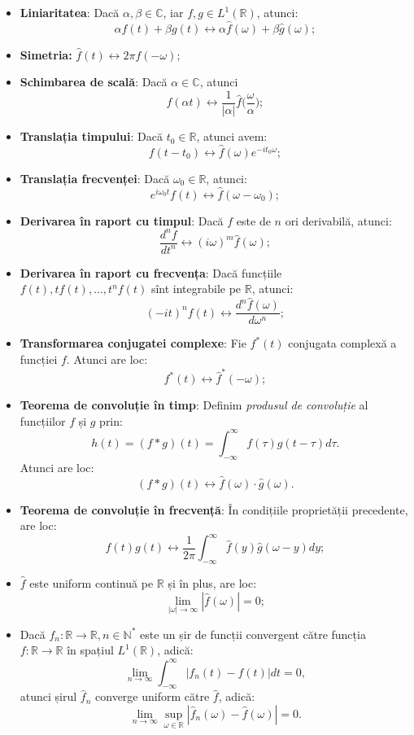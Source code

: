 \documentclass[12pt,a4paper]{article}
\newcommand\NN{\mathbb{N}}
\newcommand\RR{\mathbb{R}}
\newcommand\CC{\mathbb{C}}
\theoremstyle{dotless}
\theoremstyle{dotlessdr}
\begin{document}
\begin{itemize}
\item \textbf{Liniaritatea}: Dacă $ \alpha, \beta \in \CC $, iar $ f, g \in L^1(\RR) $,
  atunci:
  \[
    \alpha f(t) + \beta g(t) \leftrightarrow \alpha \widehat{f}(\omega) + %
    \beta \widehat{g}(\omega);
  \]
\item \textbf{Simetria:} $ \widehat{f}(t) \leftrightarrow 2 \pi f(-\omega) $;
\item \textbf{Schimbarea de scală}: Dacă $ \alpha \in \CC $, atunci
  \[
    f(\alpha t) \leftrightarrow \frac{1}{|\alpha|} \widehat{f} \Big(\frac{\omega}{\alpha}\Big);
  \]
\item \textbf{Translația timpului}: Dacă $ t_0 \in \RR $, atunci avem:
  \[
    f(t - t_0) \leftrightarrow \widehat{f}(\omega) e^{-it_0\omega};
  \]
\item \textbf{Translația frecvenței}: Dacă $ \omega_0 \in \RR $, atunci:
  \[
    e^{i\omega_0 t} f(t) \leftrightarrow \widehat{f}(\omega - \omega_0);
  \]
\item \textbf{Derivarea în raport cu timpul}: Dacă $ f $ este de $ n $ ori derivabilă,
  atunci:
  \[
    \frac{d^n f}{dt^n} \leftrightarrow (i\omega)^m \widehat{f}(\omega);
  \]
\item \textbf{Derivarea în raport cu frecvența}: Dacă funcțiile $ f(t), tf(t), \dots, %
  t^n f(t) $ sînt integrabile pe $ \RR $, atunci:
  \[
    (-it)^n f(t) \leftrightarrow \frac{d^n \widehat{f}(\omega)}{d\omega^n};
  \]
\item \textbf{Transformarea conjugatei complexe}: Fie $ f^\ast(t) $ conjugata
  complexă a funcției $ f $. Atunci are loc:
  \[
    f^\ast(t) \leftrightarrow \widehat{f}^\ast(-\omega);
  \]
\item \textbf{Teorema de convoluție în timp}: Definim \emph{produsul de convoluție}
  al funcțiilor $ f $ și $ g $ prin:
  \[
    h(t) = (f \ast g)(t) = \int_{-\infty}^\infty f(\tau)g(t - \tau) d\tau.
  \]
  Atunci are loc:
  \[
    (f \ast g)(t) \leftrightarrow \widehat{f}(\omega) \cdot \widehat{g}(\omega).
  \]
\item \textbf{Teorema de convoluție în frecvență}: În condițiile proprietății precedente,
  are loc:
  \[
    f(t) g(t) \leftrightarrow %
    \frac{1}{2\pi} \int_{-\infty}^\infty \widehat{f}(y) \widehat{g}(\omega - y) dy;
  \]
\item $ \widehat{f} $ este uniform continuă pe $ \RR $ și în plus, are loc:
  \[
    \lim_{|\omega| \to \infty} |\widehat{f}(\omega)| = 0;
  \]
\item Dacă $ f_n : \RR \to \RR, n \in \NN^\ast $ este un șir de funcții convergent
  către funcția $ f : \RR \to \RR $ în spațiul $ L^1(\RR) $, adică:
  \[
    \lim_{n \to \infty} \int_{-\infty}^\infty |f_n(t) - f(t)| dt = 0,
  \]
  atunci șirul $ \widehat{f}_n $ converge uniform către $ \widehat{f} $, adică:
  \[
    \lim_{n \to \infty} \sup_{\omega \in \RR} |\widehat{f}_n(\omega) - \widehat{f}(\omega)| = 0.
  \]
\end{itemize}
\end{document}
